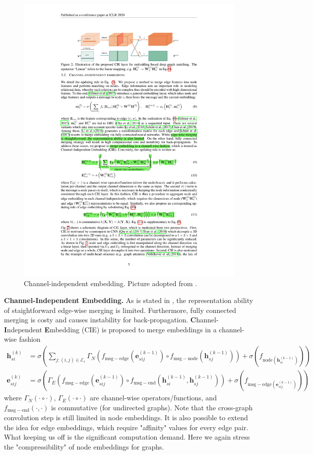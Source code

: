 \documentclass[a4paper]{article}
\begin{document}
\begin{figure}[htbp]
    \centering
    \includegraphics[width=0.6\linewidth]{Images/cie-detail.pdf}
    \caption{Channel-independent embedding. Picture adopted from \cite{cie}.}
\end{figure}

\textbf{Channel-Independent Embedding.}
As is stated in \cite{cie}, the representation ability of staightforward edge-wise merging is limited. Furthermore, fully connected merging is costy and causes instability for back-propagation. \textbf{C}hannel-\textbf{I}ndependent \textbf{E}mbedding (CIE) is proposed to merge embeddings in a channel-wise fashion
\begin{align}
    \mathbf{h}_{si}^{(k)} &= \sigma\left(\sum_{j:(i,j)\in \mathcal{E}_s} \Gamma_N \left(f_{\mathrm{msg-edge}}\left(\mathbf{e}_{sij}^{(k-1)}\right)  \circ f_{\mathrm{msg-node}}\left(\mathbf{h}_{sj}^{(k-1)}\right) \right) + \sigma\left(f_{\mathrm{node}\left(\mathbf{h}_{si}^{(k-1)}\right)}\right) \right)   \\
    \mathbf{e}_{sij}^{(k)} &= \sigma\left(\Gamma_E \left(f_{\mathrm{msg-edge}}\left(\mathbf{e}_{sij}^{(k-1)}\right)  \circ f_{\mathrm{msg-end}}\left(\mathbf{h}_{si}^{(k-1)}, \mathbf{h}_{sj}^{(k-1)}\right) \right) + \sigma\left(f_{\mathrm{msg-edge}\left(\mathbf{e}_{sij}^{(k-1)}\right)}\right) \right)  
\end{align}
where $\Gamma_N \left(\cdot \circ \cdot\right)$, $\Gamma_E \left(\cdot \circ \cdot\right)$ are channel-wise operators/functions, and $f_{\mathrm{msg-end}}(\cdot, \cdot)$ is commutative (for undirected graphs). Note that the cross-graph convolution step is still limited in node embeddings. It is also possible to extend the idea for edge embeddings, which require "affinity" values for every edge pair. What keeping us off is the significant computation demand. Here we again stress the "compressibility" of node embeddings for graphs.
\end{document}
